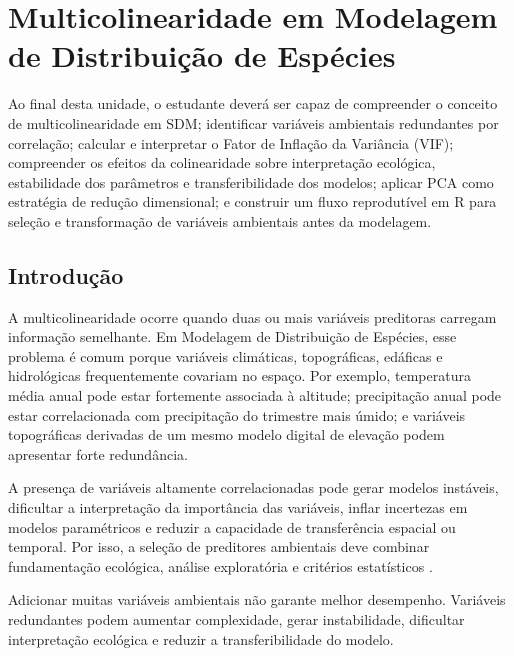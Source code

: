\chapter[Multicolinearidade]{Multicolinearidade em Modelagem de Distribuição de Espécies}

\begin{objetivos}
	Ao final desta unidade, o estudante deverá ser capaz de compreender o conceito de multicolinearidade em SDM; identificar variáveis ambientais redundantes por correlação; calcular e interpretar o Fator de Inflação da Variância (VIF); compreender os efeitos da colinearidade sobre interpretação ecológica, estabilidade dos parâmetros e transferibilidade dos modelos; aplicar PCA como estratégia de redução dimensional; e construir um fluxo reprodutível em R para seleção e transformação de variáveis ambientais antes da modelagem.
\end{objetivos}

\section{Introdução}

A multicolinearidade ocorre quando duas ou mais variáveis preditoras carregam informação semelhante. Em Modelagem de Distribuição de Espécies, esse problema é comum porque variáveis climáticas, topográficas, edáficas e hidrológicas frequentemente covariam no espaço. Por exemplo, temperatura média anual pode estar fortemente associada à altitude; precipitação anual pode estar correlacionada com precipitação do trimestre mais úmido; e variáveis topográficas derivadas de um mesmo modelo digital de elevação podem apresentar forte redundância.

A presença de variáveis altamente correlacionadas pode gerar modelos instáveis, dificultar a interpretação da importância das variáveis, inflar incertezas em modelos paramétricos e reduzir a capacidade de transferência espacial ou temporal. Por isso, a seleção de preditores ambientais deve combinar fundamentação ecológica, análise exploratória e critérios estatísticos \parencite{guisan2017habitat,naimi2016sdm,raes2018modeling}.

\begin{atencao}[title={\faExclamationTriangle\quad Mais variáveis não significam melhor modelo}]
	Adicionar muitas variáveis ambientais não garante melhor desempenho. Variáveis redundantes podem aumentar complexidade, gerar instabilidade, dificultar interpretação ecológica e reduzir a transferibilidade do modelo.
\end{atencao}

